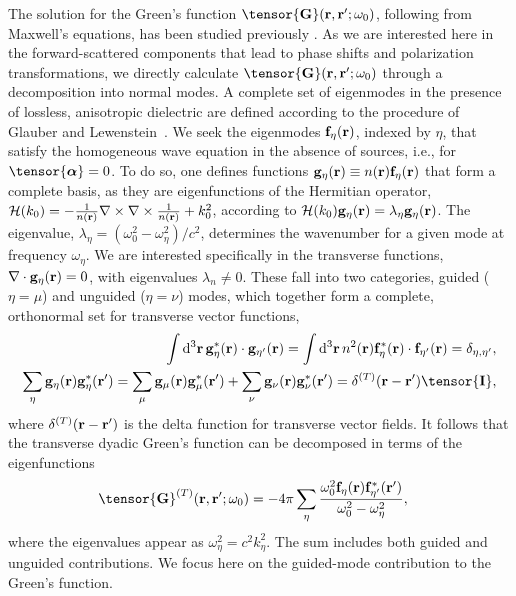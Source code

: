 \documentclass[preprint, aps,pra,onecolumn]{revtex4-1} %
\newcommand{\unittens}{\tensor{\mathbf{I}}}
\newcommand{\eigenf}{\mbf{f}_\eta}
\newcommand{\eigenfp}{\mbf{f}_{\eta'}}
\newcommand{\eigeng}{\mbf{g}_\eta}
\newcommand{\eigengp}{\mbf{g}_{\eta'}}
\begin{document}
The solution for the Green's function $\tensor{\mathbf{G}}(\br ,\br' ; \omega_0)$, following from Maxwell's equations,  
has been studied previously \cite{sakoda_optical_1996,sondergaard_general_2001,wubs_multiple-scattering_2004}.  As we are interested here in the forward-scattered components that lead to phase shifts and polarization transformations, we directly calculate $\tensor{\mathbf{G}}(\br ,\br' ; \omega_0)$ through a decomposition into normal modes.  A complete set of eigenmodes in the presence of lossless, anisotropic dielectric are defined according to the procedure of Glauber and Lewenstein~\cite{glauber_quantum_1991}.  We seek the eigenmodes $\eigenf(\mathbf{r})$, indexed by $\eta$, that satisfy the homogeneous wave equation in the absence of sources, i.e.,  for $\tensor{\boldsymbol{\alpha}} = 0$.  To do so, one defines functions $\eigeng(\mbf{r}) \equiv n(\br) \eigenf(\mbf{r})$ that form a complete basis, as they are eigenfunctions of the Hermitian operator, $\mathcal{H}(k_0) = -\frac{1}{n(\mathbf{r})} \nabla\times\nabla\times \frac{1}{n(\mathbf{r})} + k_0^2$, according to $\mathcal{H}(k_0)  \eigeng(\mbf{r}) = \lambda_\eta \eigeng(\mbf{r})$. The eigenvalue, {\color{blue} $\lambda_\eta= (\omega_0^2-\omega_\eta^2)/c^2$}, determines the wavenumber for a given mode {\color{blue} at frequency $\omega_\eta$}.  We are interested specifically in the transverse functions, $\nabla \cdot \eigeng(\br) = 0$, with eigenvalues $\lambda_n \neq 0$.  These fall into two categories, guided {\color{blue} ($\eta = \mu$)} and unguided {\color{blue} ($\eta = \nu$)} modes, which {\color{blue} together} form a complete, orthonormal set for transverse vector functions,
	\begin{align}
	\int \mathrm{d}^3\br \, \eigeng^*(\mbf{r}) \cdot \eigengp(\mbf{r})  = \int \mathrm{d}^3\br \, n^2(\br) \eigenf^* (\br)\cdot  \eigenfp(\br) =\delta_{\eta, \eta'},\label{Eq::Orthogonality}\\
	 \sum_\eta \mathbf{g}_\eta(\br) \mathbf{g}_\eta^*(\br') =  \sum_\mu \mathbf{g}_\mu(\br) \mathbf{g}_\mu^*(\br')  + \sum_\nu \mathbf{g}_\nu(\br) \mathbf{g}_\nu^*(\br')  =\delta^{(T)}(\br-\br')  \unittens, \label{Eq::Completeness}
	\end{align}
where $\delta^{(T)}(\mathbf{r}-\mathbf{r}')$ is the delta function for transverse vector fields.  It follows that the transverse dyadic Green's function can be decomposed in terms of the eigenfunctions~\cite{sakoda_optical_1996, sondergaard_general_2001}
	\begin{align}
		\tensor{\mathbf{G}}^{(T)}(\br,\br'; \omega_0) &= -4\pi \sum_{\eta} \frac{  \omega_0^2 \eigenf (\br) 
\eigenfp^* (\br')}{\omega_0^2-\omega_\eta^2},
	\end{align}
where the eigenvalues appear as $\omega_\eta^2 = c^2 k_\eta^2$.  The sum includes both guided and unguided contributions. We focus here on the guided-mode contribution to the Green's function. 
\end{document}
